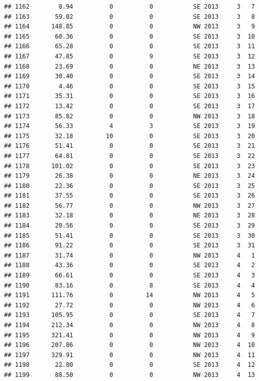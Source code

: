 \documentclass[
]{article}
\begin{document}
\begin{verbatim}
## 1162        8.94          0          0           SE 2013     3   7
## 1163       59.02          0          0           SE 2013     3   8
## 1164      148.85          0          0           NW 2013     3   9
## 1165       60.36          0          0           SE 2013     3  10
## 1166       65.28          0          0           SE 2013     3  11
## 1167       47.85          0          9           SE 2013     3  12
## 1168       23.69          0          0           NE 2013     3  13
## 1169       30.40          0          0           SE 2013     3  14
## 1170        4.46          0          0           SE 2013     3  15
## 1171       35.31          0          0           SE 2013     3  16
## 1172       13.42          0          0           SE 2013     3  17
## 1173       85.82          0          0           NW 2013     3  18
## 1174       56.33          4          3           SE 2013     3  19
## 1175       32.18         10          0           SE 2013     3  20
## 1176       51.41          0          0           SE 2013     3  21
## 1177       64.81          0          0           SE 2013     3  22
## 1178      101.02          0          0           SE 2013     3  23
## 1179       26.38          0          0           NE 2013     3  24
## 1180       22.36          0          0           SE 2013     3  25
## 1181       37.55          0          0           SE 2013     3  26
## 1182       56.77          0          0           NW 2013     3  27
## 1183       32.18          0          0           NE 2013     3  28
## 1184       20.56          0          0           SE 2013     3  29
## 1185       51.41          0          0           SE 2013     3  30
## 1186       91.22          0          0           SE 2013     3  31
## 1187       31.74          0          0           NW 2013     4   1
## 1188       43.36          0          0           SE 2013     4   2
## 1189       66.61          0          0           SE 2013     4   3
## 1190       83.16          0          8           SE 2013     4   4
## 1191      111.76          0         14           NW 2013     4   5
## 1192       27.72          0          0           NW 2013     4   6
## 1193      105.95          0          0           SE 2013     4   7
## 1194      212.34          0          0           NW 2013     4   8
## 1195      321.41          0          0           NW 2013     4   9
## 1196      207.86          0          0           NW 2013     4  10
## 1197      329.91          0          0           NW 2013     4  11
## 1198       22.80          0          0           SE 2013     4  12
## 1199       88.50          0          0           NW 2013     4  13

\end{verbatim}
\end{document}
